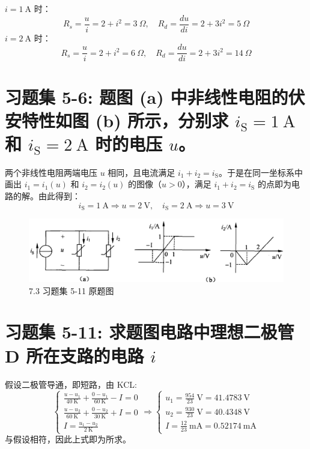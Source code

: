 \documentclass[UTF8]{report}
\def\K{\ \mathrm{K}}
\def\mA{\ \mathrm{mA}}
\theoremstyle{MyLineTheoremStyle} %
\theoremstyle{MyBlockTheoremStyle} %
\theoremstyle{MySubsubsectionStyle} %
\begin{document}
\noindent $i = 1 \ \mathrm{A}$ 时：
\begin{equation}
R_s = \frac{u}{i} = 2 + i^2 = 3 \ \Omega,\quad R_d = \frac{du}{di} = 2 + 3i^2 = 5 \ \Omega
\end{equation}
$i = 2 \ \mathrm{A}$ 时：
\begin{equation}
R_s = \frac{u}{i} = 2 + i^2 = 6 \ \Omega,\quad R_d = \frac{du}{di} = 2 + 3i^2 = 14 \ \Omega
\end{equation}


\section{习题集 5-6: 题图 (a) 中非线性电阻的伏安特性如图 (b) 所示，分别求 $i_\text{S} = 1 \ \mathrm{A}$ 和 $i_{\text{S}} = 2 \ \mathrm{A}$ 时的电压 $u$。}

两个非线性电阻两端电压 $u$ 相同，且电流满足 $i_1 + i_2 = i_{\text{S}}$。于是在同一坐标系中画出 $i_1 = i_1(u)$ 和 $i_2 = i_2(u)$ 的图像（$u > 0$），满足  $i_1 + i_2 = i_{\text{S}}$ 的点即为电路的解。由此得到：
\begin{equation}
    i_\text{S} = 1 \ \mathrm{A} \Longrightarrow u = 2 \ \mathrm{V},\quad i_\text{S} = 2 \ \mathrm{A} \Longrightarrow u = 3 \ \mathrm{V}
\end{equation}
\begin{figure}[H]\centering
\includegraphics[width=0.8\columnwidth]{assets/7/7.3 习题集 5-11.png}
\caption{7.3 习题集 5-11 原题图}\label{7.3 习题集 5-11}
\end{figure}

\section{习题集 5-11: 求题图电路中理想二极管 D 所在支路的电路 $i$}
假设二极管导通，即短路，由 KCL:
\begin{equation}
\begin{cases}
    \frac{u - u_1}{40 \K} + \frac{0 - u_1}{60 \K} - I = 0 \\ 
    \frac{u - u_2}{60 \K} + \frac{0 - u_2}{30 \K} + I = 0 \\ 
    I = \frac{u_1 - u_2}{2 \K}
\end{cases}\Longrightarrow 
\begin{cases}
    u_1 = \frac{954}{23} \ \mathrm{V} = 41.4783 \ \mathrm{V}\\ 
    u_2 = \frac{930}{23} \ \mathrm{V} = 40.4348 \ \mathrm{V}\\ 
    I = \frac{12}{23} \mA =  0.52174 \mA
\end{cases}
\end{equation}
与假设相符，因此上式即为所求。
\end{document}
